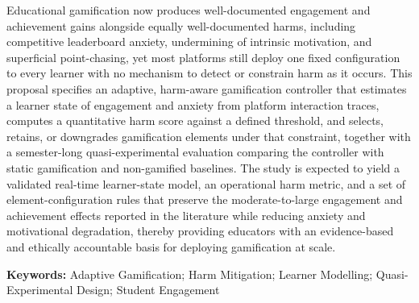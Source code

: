 \documentclass[12pt,a4paper]{article}
\begin{document}
\begin{justify}

Educational gamification now produces well-documented engagement and achievement gains alongside equally well-documented harms, including competitive leaderboard anxiety, undermining of intrinsic motivation, and superficial point-chasing, yet most platforms still deploy one fixed configuration to every learner with no mechanism to detect or constrain harm as it occurs. This proposal specifies an adaptive, harm-aware gamification controller that estimates a learner state of engagement and anxiety from platform interaction traces, computes a quantitative harm score against a defined threshold, and selects, retains, or downgrades gamification elements under that constraint, together with a semester-long quasi-experimental evaluation comparing the controller with static gamification and non-gamified baselines. The study is expected to yield a validated real-time learner-state model, an operational harm metric, and a set of element-configuration rules that preserve the moderate-to-large engagement and achievement effects reported in the literature while reducing anxiety and motivational degradation, thereby providing educators with an evidence-based and ethically accountable basis for deploying gamification at scale.

\vspace{0.3cm}

\textbf{Keywords:} Adaptive Gamification; Harm Mitigation; Learner Modelling; Quasi-Experimental Design; Student Engagement

\end{justify}





\newpage

\tableofcontents

\newpage



\end{document}
